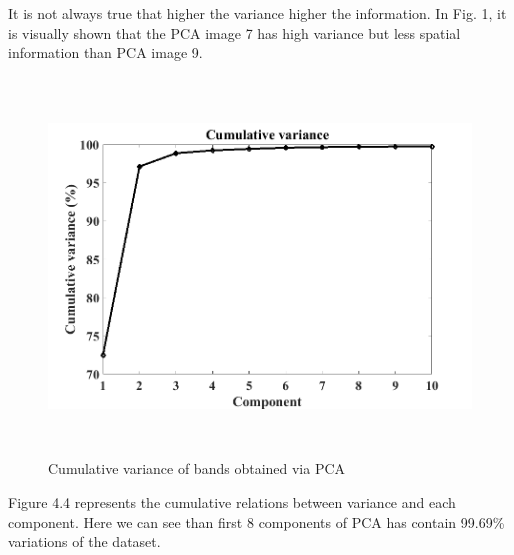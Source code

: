 \documentclass[document.tex]{subfiles}
\begin{document}
\noindent It is not always true that higher the variance higher the information. In Fig. 1, it is visually shown that the PCA image 7 has high variance but less spatial information than PCA image 9.
\begin{figure}[H]
	\begin{center}
		\includegraphics[height=10.0cm]{imgs/Var.png}
	\end{center}
	\caption{Cumulative variance of bands obtained via PCA}
	\label{fig:Cumulative variance of bands obtained via PCA}
\end{figure}
\noindent Figure 4.4 represents the cumulative relations between variance and each component. Here we can see than first 8 components of PCA has contain 99.69\% variations of the dataset.
\end{document}
